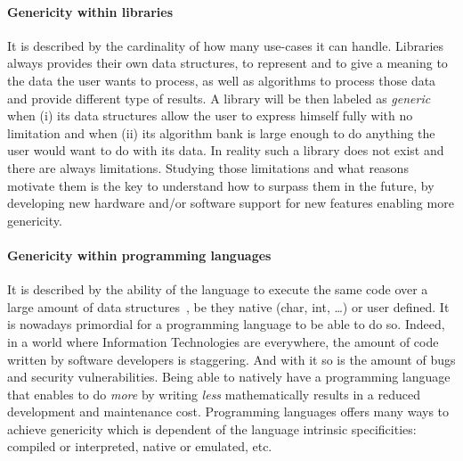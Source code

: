 \paragraph{Genericity within libraries} It is described by the cardinality of how many use-cases it can handle.
Libraries always provides their own data structures, to represent and to give a meaning to the data the user wants to
process, as well as algorithms to process those data and provide different type of results. A library will be then
labeled as \emph{generic}~\parencite{musser.1994.algorithm} when (i) its data structures allow the user to express
himself fully with no limitation and when (ii) its algorithm bank is large enough to do anything the user would want to
do with its data. In reality such a library does not exist and there are always limitations. Studying those limitations
and what reasons motivate them is the key to understand how to surpass them in the future, by developing new hardware
and/or software support for new features enabling more genericity.

\paragraph{Genericity within programming languages} It is described by the ability of the language to execute the same
code over a large amount of data structures~\parencite{dehnert.1998.fundamentals}, be they native (char, int, \ldots) or
user defined. It is nowadays primordial for a programming language to be able to do so. Indeed, in a world where
Information Technologies are everywhere, the amount of code written by software developers is staggering. And with it so
is the amount of bugs and security vulnerabilities. Being able to natively have a programming language that enables to
do \emph{more} by writing \emph{less} mathematically results in a reduced development and maintenance cost. Programming
languages offers many ways to achieve genericity which is dependent of the language intrinsic specificities: compiled or
interpreted, native or emulated, etc.

